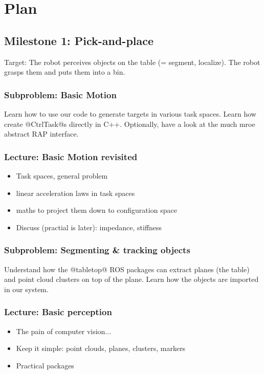 \documentclass[10pt,fleqn,twoside]{article}
\begin{document}
\section{Plan}

\subsection{Milestone 1: Pick-and-place}

Target: The robot perceives objects on the table (= segment,
localize). The robot grasps them and puts them into a bin.

\subsubsection{Subproblem: Basic Motion}

Learn how to use our code to generate targets in various task
spaces. Learn how create @CtrlTask@s directly in C++. Optionally, have
a look at the much mroe abstract RAP interface.

\subsubsection{Lecture: Basic Motion revisited}
\begin{itemize}
\item Task spaces, general problem
\item linear acceleration laws in task spaces
\item maths to project them down to configuration space
\item Discuss (practial is later): impedance, stiffness
\end{itemize}

\subsubsection{Subproblem: Segmenting \& tracking objects}

Understand how the @tabletop@ ROS packages can extract planes (the
table) and point cloud clusters on top of the plane. Learn how the
objects are imported in our system.

\subsubsection{Lecture: Basic perception}
\begin{itemize}
\item The pain of computer vision...
\item Keep it simple: point clouds, planes, clusters, markers
\item Practical packages
\end{itemize}
\end{document}
